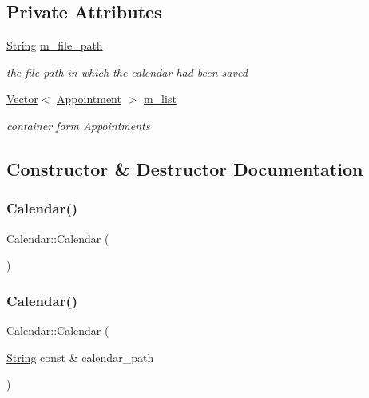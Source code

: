 \subsection*{Private Attributes}
\begin{DoxyCompactItemize}
\item 
\hyperlink{classString}{String} \hyperlink{classCalendar_a886351ebec41505485aa58503c6448d6}{m\+\_\+file\+\_\+path}
\begin{DoxyCompactList}\small\item\em the file path in which the calendar had been saved \end{DoxyCompactList}\item 
\hyperlink{classVector}{Vector}$<$ \hyperlink{classAppointment}{Appointment} $>$ \hyperlink{classCalendar_a4cf793b2acf7116988fd212628f79a59}{m\+\_\+list}
\begin{DoxyCompactList}\small\item\em container form Appointments \end{DoxyCompactList}\end{DoxyCompactItemize}


\subsection{Constructor \& Destructor Documentation}
\mbox{\label{classCalendar_a568f7ef431263d9667286aebac96febf}} 
\subsubsection{\texorpdfstring{Calendar()}{Calendar()}\hspace{0.1cm}{\footnotesize\ttfamily [1/3]}}
{\footnotesize\ttfamily Calendar\+::\+Calendar (\begin{DoxyParamCaption}{ }\end{DoxyParamCaption})\hspace{0.3cm}{\ttfamily [default]}}

\mbox{\label{classCalendar_a54d7e31f38979ee7a363594b86ca9419}} 
\subsubsection{\texorpdfstring{Calendar()}{Calendar()}\hspace{0.1cm}{\footnotesize\ttfamily [2/3]}}
{\footnotesize\ttfamily Calendar\+::\+Calendar (\begin{DoxyParamCaption}\item[{\hyperlink{classString}{String} const \&}]{calendar\+\_\+path }\end{DoxyParamCaption})}

